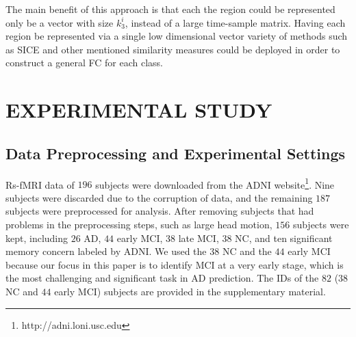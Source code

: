 \documentclass[preprint,12pt]{elsarticle}
\begin{document}
	The main benefit of this approach is that each
	the region could be represented only be a vector with size $k_3^i$, instead of a large time-sample matrix. Having each region be represented via a single low dimensional vector variety of methods such as SICE and other mentioned similarity measures could be deployed in order to construct a general FC for each class. 
	
	
	
	\section{EXPERIMENTAL STUDY}
	\subsection{Data Preprocessing and Experimental Settings}
	
	Rs-fMRI data of $196$ subjects were downloaded from the ADNI website\footnote{http://adni.loni.usc.edu}. Nine subjects were discarded
	due to the corruption of data, and the remaining $187$ subjects were preprocessed for analysis. After removing subjects that had problems in the preprocessing steps, such as large head motion,
	$156$ subjects were kept, including $26$ AD, $44$ early MCI, $38$ late MCI, $38$ NC, and ten significant memory concern labeled by ADNI. We used the $38$ NC and the $44$ early MCI because our focus in this paper is to identify MCI at a very early stage, which is the most challenging and significant task in AD
	prediction. The IDs of the $82$ ($38$ NC and $44$ early MCI) subjects are provided in the supplementary material. 
	
\end{document}
